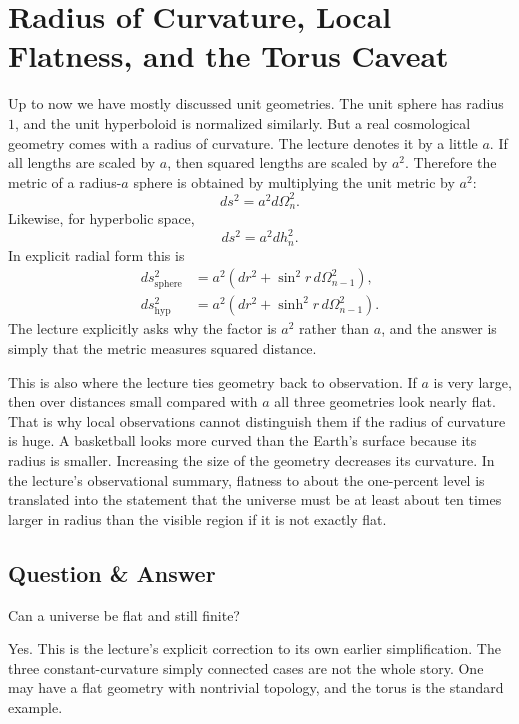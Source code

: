\section{Radius of Curvature, Local Flatness, and the Torus Caveat}

Up to now we have mostly discussed unit geometries. The unit sphere has radius \(1\), and the unit hyperboloid is normalized similarly. But a real cosmological geometry comes with a radius of curvature. The lecture denotes it by a little \(a\). If all lengths are scaled by \(a\), then squared lengths are scaled by \(a^2\). Therefore the metric of a radius-\(a\) sphere is obtained by multiplying the unit metric by \(a^2\):
\begin{equation}
ds^2 = a^2 d\Omega_n^2.
\end{equation}
Likewise, for hyperbolic space,
\begin{equation}
ds^2 = a^2 dh_n^2.
\end{equation}
In explicit radial form this is
\begin{align}
ds_{\mathrm{sphere}}^2 &= a^2\left(dr^2 + \sin^2 r\, d\Omega_{n-1}^2\right),\\
ds_{\mathrm{hyp}}^2 &= a^2\left(dr^2 + \sinh^2 r\, d\Omega_{n-1}^2\right).
\end{align}
The lecture explicitly asks why the factor is \(a^2\) rather than \(a\), and the answer is simply that the metric measures squared distance.

This is also where the lecture ties geometry back to observation. If \(a\) is very large, then over distances small compared with \(a\) all three geometries look nearly flat. That is why local observations cannot distinguish them if the radius of curvature is huge. A basketball looks more curved than the Earth's surface because its radius is smaller. Increasing the size of the geometry decreases its curvature. In the lecture's observational summary, flatness to about the one-percent level is translated into the statement that the universe must be at least about ten times larger in radius than the visible region if it is not exactly flat.

\subsection{Question \& Answer}

Can a universe be flat and still finite?

Yes. This is the lecture's explicit correction to its own earlier simplification. The three constant-curvature simply connected cases are not the whole story. One may have a flat geometry with nontrivial topology, and the torus is the standard example.

